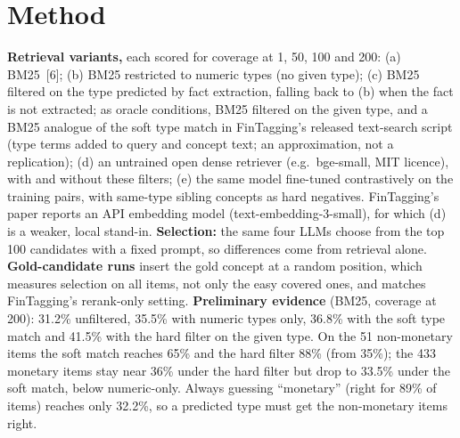 \documentclass[10pt]{article}
\begin{document}
\section{Method}
\textbf{Retrieval variants,} each scored for coverage at 1, 50, 100 and 200: (a) BM25~[6]; (b) BM25 restricted to
numeric types (no given type); (c) BM25 filtered on the type predicted by fact extraction, falling back to (b) when the
fact is not extracted; as oracle conditions, BM25 filtered on the given type, and a BM25 analogue of the soft type match
in FinTagging's released text-search script (type terms added to query and concept text; an approximation, not a
replication); (d) an untrained open dense retriever (e.g.\ bge-small, MIT licence), with and without these
filters; (e) the same model fine-tuned contrastively on the training pairs, with same-type sibling concepts as hard
negatives. FinTagging's paper reports an API embedding model (text-embedding-3-small), for which (d) is a weaker, local
stand-in. \textbf{Selection:} the same four LLMs choose from the top 100 candidates with a fixed prompt, so differences
come from retrieval alone. \textbf{Gold-candidate runs} insert the gold concept at a random position, which measures
selection on all items, not only the easy covered ones, and matches FinTagging's rerank-only setting.
\textbf{Preliminary evidence} (BM25, coverage at 200): 31.2\% unfiltered, 35.5\% with numeric types only, 36.8\% with the
soft type match and 41.5\% with the hard filter on the given type. On the 51 non-monetary items the soft match reaches
65\% and the hard filter 88\% (from 35\%); the 433 monetary items stay near 36\% under the hard filter but drop to
33.5\% under the soft match, below numeric-only. Always guessing ``monetary'' (right for
89\% of items) reaches only 32.2\%, so a predicted type must get the non-monetary items right.
\end{document}
